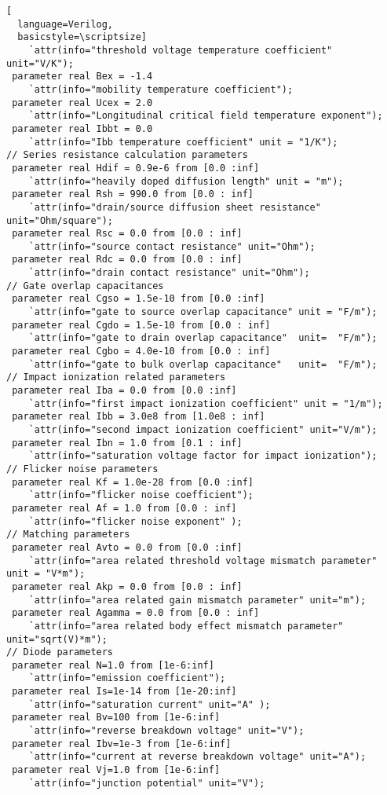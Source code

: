\begin{lstlisting}[
  language=Verilog,
  basicstyle=\scriptsize]
	`attr(info="threshold voltage temperature coefficient" unit="V/K");
 parameter real Bex = -1.4     
	`attr(info="mobility temperature coefficient");
 parameter real Ucex = 2.0     
	`attr(info="Longitudinal critical field temperature exponent");
 parameter real Ibbt = 0.0     
	`attr(info="Ibb temperature coefficient" unit = "1/K");
// Series resistance calculation parameters
 parameter real Hdif = 0.9e-6 from [0.0 :inf]  
	`attr(info="heavily doped diffusion length" unit = "m");
 parameter real Rsh = 990.0 from [0.0 : inf]   
	`attr(info="drain/source diffusion sheet resistance" unit="Ohm/square");
 parameter real Rsc = 0.0 from [0.0 : inf]     
	`attr(info="source contact resistance" unit="Ohm");
 parameter real Rdc = 0.0 from [0.0 : inf]     
	`attr(info="drain contact resistance" unit="Ohm");
// Gate overlap capacitances
 parameter real Cgso = 1.5e-10 from [0.0 :inf]  
	`attr(info="gate to source overlap capacitance" unit = "F/m");
 parameter real Cgdo = 1.5e-10 from [0.0 : inf] 
	`attr(info="gate to drain overlap capacitance"  unit=  "F/m");
 parameter real Cgbo = 4.0e-10 from [0.0 : inf] 
	`attr(info="gate to bulk overlap capacitance"   unit=  "F/m");
// Impact ionization related parameters
 parameter real Iba = 0.0 from [0.0 :inf]        
	`attr(info="first impact ionization coefficient" unit = "1/m");
 parameter real Ibb = 3.0e8 from [1.0e8 : inf]   
	`attr(info="second impact ionization coefficient" unit="V/m");
 parameter real Ibn = 1.0 from [0.1 : inf]       
	`attr(info="saturation voltage factor for impact ionization");
// Flicker noise parameters
 parameter real Kf = 1.0e-28 from [0.0 :inf]  
	`attr(info="flicker noise coefficient");
 parameter real Af = 1.0 from [0.0 : inf]     
	`attr(info="flicker noise exponent" );
// Matching parameters
 parameter real Avto = 0.0 from [0.0 :inf]     
	`attr(info="area related threshold voltage mismatch parameter" unit = "V*m");
 parameter real Akp = 0.0 from [0.0 : inf]     
	`attr(info="area related gain mismatch parameter" unit="m");
 parameter real Agamma = 0.0 from [0.0 : inf]  
	`attr(info="area related body effect mismatch parameter" unit="sqrt(V)*m");
// Diode parameters
 parameter real N=1.0 from [1e-6:inf] 
	`attr(info="emission coefficient");
 parameter real Is=1e-14 from [1e-20:inf] 
	`attr(info="saturation current" unit="A" );
 parameter real Bv=100 from [1e-6:inf] 
	`attr(info="reverse breakdown voltage" unit="V");
 parameter real Ibv=1e-3 from [1e-6:inf] 
	`attr(info="current at reverse breakdown voltage" unit="A");
 parameter real Vj=1.0 from [1e-6:inf] 
	`attr(info="junction potential" unit="V");

\end{lstlisting}
